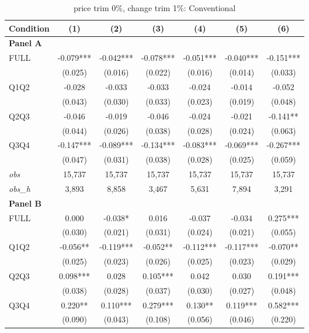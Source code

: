 \begin{table}[!htbp]
\centering
\caption{price trim 0\%, change trim 1\%: Conventional}
\label{tab:abc:trim01:conventional}
\small
\begin{tabular}{lcccccc}
\toprule
Condition & (1) & (2) & (3) & (4) & (5) & (6) \\
\midrule
\textbf{Panel A} &&&&&&  \\

FULL & -0.079*** & -0.042*** & -0.078*** & -0.051*** & -0.040*** & -0.151*** \\
 & (0.025) & (0.016) & (0.022) & (0.016) & (0.014) & (0.033) \\
Q1Q2 & -0.028 & -0.033 & -0.033 & -0.024 & -0.014 & -0.052 \\
 & (0.043) & (0.030) & (0.033) & (0.023) & (0.019) & (0.048) \\
Q2Q3 & -0.046 & -0.019 & -0.046 & -0.024 & -0.021 & -0.141** \\
 & (0.044) & (0.026) & (0.038) & (0.028) & (0.024) & (0.063) \\
Q3Q4 & -0.147*** & -0.089*** & -0.134*** & -0.083*** & -0.069*** & -0.267*** \\
 & (0.047) & (0.031) & (0.038) & (0.028) & (0.025) & (0.059) \\

\textit{obs} & 15,737 & 15,737 & 15,737 & 15,737 & 15,737 & 15,737 \\
\textit{obs\_h} & 3,893 & 8,858 & 3,467 & 5,631 & 7,894 & 3,291 \\

\textbf{Panel B} &&&&&&  \\

FULL & 0.000 & -0.038* & 0.016 & -0.037 & -0.034 & 0.275*** \\
 & (0.030) & (0.021) & (0.031) & (0.024) & (0.021) & (0.055) \\
Q1Q2 & -0.056** & -0.119*** & -0.052** & -0.112*** & -0.117*** & -0.070** \\
 & (0.025) & (0.023) & (0.026) & (0.025) & (0.023) & (0.029) \\
Q2Q3 & 0.098*** & 0.028 & 0.105*** & 0.042 & 0.030 & 0.191*** \\
 & (0.038) & (0.028) & (0.037) & (0.030) & (0.027) & (0.048) \\
Q3Q4 & 0.220** & 0.110*** & 0.279*** & 0.130** & 0.119*** & 0.582*** \\
 & (0.090) & (0.043) & (0.108) & (0.056) & (0.046) & (0.220) \\


\end{tabular}
\end{table}
